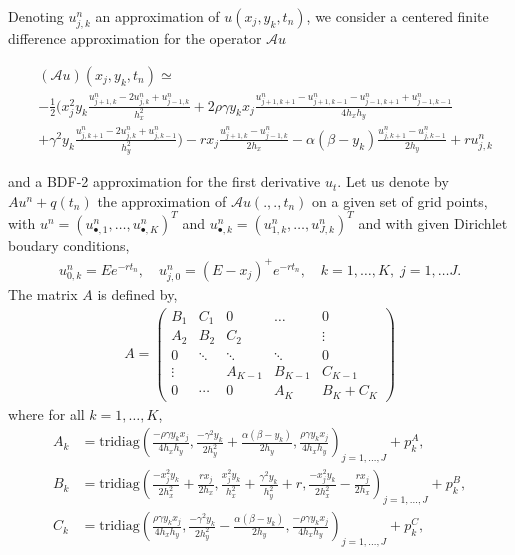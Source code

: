 \documentclass[12pt,a4paper]{article}
\begin{document}
Denoting $u_{j,k}^n$ an approximation of $u(x_j,y_k,t_n)$, we consider a centered finite difference approximation for the operator $\mathcal{A}u$ 
\begin{footnotesize}
\begin{align*}
	&(\mathcal{A}u)(x_j,y_k,t_n) \simeq \\
	&-\frac{1}{2} \bigg( x_j^2 y_k \frac{u_{j+1,k}^n - 2u_{j,k}^n + u_{j-1,k}^n}{h_x^2} 
	 +2 \rho \gamma y_k x_j \frac{u_{j+1,k+1}^n - u_{j+1,k-1}^n - u_{j-1,k+1}^n + u_{j-1,k-1}^n}{4 h_x h_y} \\ 
	&+ \gamma^2 y_k \frac{u_{j,k+1}^n - 2 u_{j,k}^n + u_{j,k-1}^n}{h_y^2} \bigg) - r x_j \frac{u_{j+1,k}^n-u_{j-1,k}^n}{2h_x} - \alpha (\beta - y_k) \frac{u_{j,k+1}^n - u_{j,k-1}^n}{2 h_y} + ru_{j,k}^n
\end{align*}
\end{footnotesize}
and a BDF-2 approximation for the first derivative $u_t$. Let us denote by $A u^n + q(t_n)$ the approximation of $\mathcal{A}u(.,.,t_n)$ on a given set of grid points, with $u^n = (u_{\bullet,1}^n,\dots,u_{\bullet,K}^n)^T$ and $u_{\bullet,k}^n = (u_{1,k}^n,\dots,u_{J,k}^n)^T$ and with given Dirichlet boudary conditions,
\begin{align*}
u_{0,k}^n = E e^{-r t_n}, \quad u_{j,0}^n = (E-x_j)^+ e^{-r t_n}, \quad k=1,\dots,K, \; j=1,\dots J.
\end{align*}
The matrix $A$ is defined by,
\begin{align*}
A = \begin{pmatrix}
   B_1 & C_1 & 0 & \hdots & 0 \\
   A_2 & B_2 & C_2 & & \vdots \\
   0 & \ddots & \ddots & \ddots & 0 \\
   \vdots & & A_{K-1} & B _{K-1} & C_{K-1} \\
   0 & \cdots & 0 & A_K & B_K + C_K
\end{pmatrix}
\end{align*}
where for all $k = 1, \dots, K$,
\begin{align*}
	A_k	&= \text{tridiag} \left( \frac{-\rho \gamma y_k x_j}{4 h_x h_y}, \frac{-\gamma^2 y_k}{2 h_y^2} + \frac{\alpha (\beta - y_k)}{2 h_y}, \frac{\rho \gamma y_k x_j}{4 h_x h_y} \right)_{j=1,\dots,J} + p^A_k, \\
	B_k &= \text{tridiag} \left( \frac{-x_j^2 y_k}{2h_x^2} + \frac{r x_j}{2 h_x}, \frac{x_j^2 y_k}{h_x^2} + \frac{\gamma^2 y_k}{h_y^2} + r, \frac{-x_j^2 y_k}{2 h_x^2} - \frac{r x_j}{2 h_x} \right)_{j=1,\dots,J} + p^B_k, \\
	C_k &= \text{tridiag} \left( \frac{\rho \gamma y_k x_j}{4 h_x h_y}, \frac{-\gamma^2 y_k}{2 h_y^2} - \frac{\alpha (\beta - y_k)}{2 h_y}, \frac{-\rho \gamma y_k x_j}{4 h_x h_y} \right)_{j=1,\dots,J} + p^C_k,
\end{align*}
\end{document}
